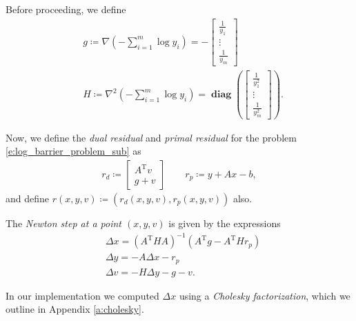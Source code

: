\documentclass[11pt]{amsart}
\theoremstyle{definition}
\theoremstyle{remark}
\newcommand{\transpose}{\text{T}}
\DeclareMathOperator{\diag}{\textbf{diag}}
\begin{document}
    Before proceeding, we define 
    \begin{align*}
        &g \coloneqq \nabla \left( -\sum_{i=1}^m \log{y_i} \right) = 
        - \begin{bmatrix}
            \frac{1}{y_1} \\
            \vdots \\
            \frac{1}{y_m}
        \end{bmatrix} \\
        &H \coloneqq \nabla^2 \left( -\sum_{i=1}^m \log{y_i} \right) = \diag\left(\begin{bmatrix}
            \frac{1}{y_1^2} \\
            \vdots \\
            \frac{1}{y_m^2}
        \end{bmatrix} \right). 
    \end{align*} 

    Now, we define the \emph{dual residual} and \emph{primal residual} for the problem \eqref{e:log_barrier_problem_sub} as
    \begin{align*}
        r_d \coloneqq
        \begin{bmatrix}
            A^\transpose v \\
            g + v
        \end{bmatrix} \quad\quad r_p \coloneqq y + Ax - b, 
    \end{align*}
    and define $r(x, y, v) \coloneqq (r_d(x, y, v), r_p(x, y, v))$ also.

    The \emph{Newton step at a point $(x, y, v)$} is given by the expressions
    \begin{align*}
        &\Delta x = (A^\transpose HA)^{-1}(A^\transpose g - A^\transpose Hr_p)\\
        &\Delta y = - A\Delta x - r_p \\
        &\Delta v = - H\Delta y - g - v.
    \end{align*}

    In our implementation we computed $\Delta x$ using a \emph{Cholesky factorization}, which we outline in Appendix \ref{a:cholesky}. 
\end{document}

